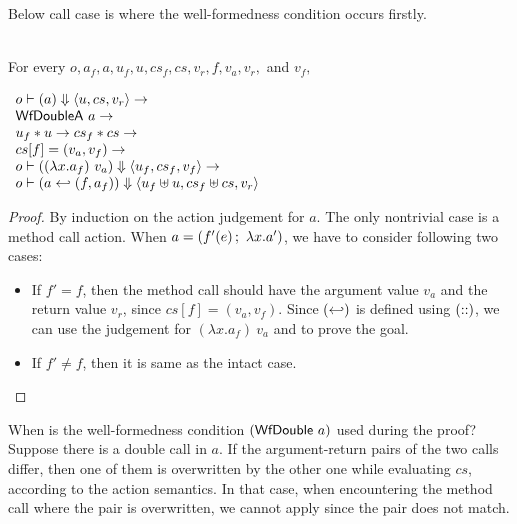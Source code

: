 Below call case is where the well-formedness condition occurs firstly.

\begin{lemma}
  \label{lem-inlinedm-action-call}
  \mbox{}\\
  For every $o, a_f, a, u_f, u, cs_f, cs, v_r, f, v_a, v_r,$ and $v_f,$
  \begin{center}
    \begin{math}
      \begin{array}{l}
        \semact{o}{a}{u}{cs}{v_r} \to \\
        \wfdoublea{a} \to \\
        \sdisj{u_f}{u} \to \mdisj{cs_f}{cs} \to \\
        cs[f] = (v_a, v_f) \to \\
        \semact{o}{(\lambda x.a_f)\ v_a}{u_f}{cs_f}{v_f} \to \\
        \semact{o}{\inlinedm{a}{(f, a_f)}}{\splus{u_f}{u}}{\mplus{cs_f}{cs}}{v_r}
      \end{array}
    \end{math}
  \end{center}
\end{lemma}
\begin{proof}
  By induction on the action judgement for $a$. The only nontrivial
  case is a method call action. When $a = (\actcall{x}{f'}{e}{a'})$,
  we have to consider following two cases:
  \begin{itemize}
  \item If $f' = f$, then the method call should have the argument
    value $v_a$ and the return value $v_r$, since $cs[f] = (v_a,
    v_f)$. Since $(\inlinedmsymb)$ is defined using $(\concatsymb)$,
    we can use the judgement for $(\lambda x.a_f)\ v_a$ and
     to prove the goal.
  \item If $f' \neq f$, then it is same as the intact case.
  \end{itemize}
\end{proof}

When is the well-formedness condition $(\wfdouble{a})$ used during the
proof? Suppose there is a double call in $a$. If the argument-return
pairs of the two calls differ, then one of them is overwritten by the
other one while evaluating $cs$, according to the action semantics. In
that case, when encountering the method call where the pair is
overwritten, we cannot apply  since the pair
does not match.

